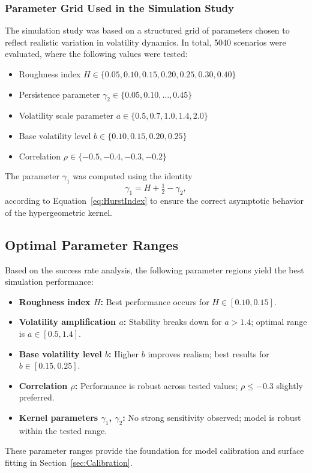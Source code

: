 \subsubsection*{Parameter Grid Used in the Simulation Study}
The simulation study was based on a structured grid of parameters chosen to reflect realistic variation in volatility dynamics. In total, 5040 scenarios were evaluated, where the following values were tested:
\begin{itemize}
    \item Roughness index $H \in \{0.05, 0.10, 0.15, 0.20, 0.25, 0.30, 0.40\}$
    \item Persistence parameter $\gamma_2 \in \{0.05, 0.10, \ldots, 0.45\}$
    \item Volatility scale parameter $a \in \{0.5, 0.7, 1.0, 1.4, 2.0\}$
    \item Base volatility level $b \in \{0.10, 0.15, 0.20, 0.25\}$
    \item Correlation $\rho \in \{-0.5, -0.4, -0.3, -0.2\}$
\end{itemize}
The parameter $\gamma_1$ was computed using the identity
\begin{equation*}
    \gamma_1 = H + \tfrac{1}{2} - \gamma_2,
\end{equation*}
according to Equation~\eqref{eq:HurstIndex} to ensure the correct asymptotic behavior of the hypergeometric kernel.


\subsection{Optimal Parameter Ranges}

Based on the success rate analysis, the following parameter regions yield the best simulation performance:
\begin{itemize}
    \item \textbf{Roughness index $H$:} Best performance occurs for $H \in [0.10, 0.15]$.
    \item \textbf{Volatility amplification $a$:} Stability breaks down for $a > 1.4$; optimal range is $a \in [0.5, 1.4]$.
    \item \textbf{Base volatility level $b$:} Higher $b$ improves realism; best results for $b \in [0.15, 0.25]$.
    \item \textbf{Correlation $\rho$:} Performance is robust across tested values; $\rho \leq -0.3$ slightly preferred.
    \item \textbf{Kernel parameters $\gamma_1$, $\gamma_2$:} No strong sensitivity observed; model is robust within the tested range.
\end{itemize}
These parameter ranges provide the foundation for model calibration and surface fitting in Section~\ref{sec:Calibration}.

